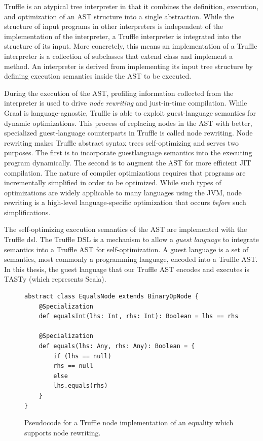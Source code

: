 Truffle is an atypical tree interpreter in that it combines the definition, execution, and optimization of an AST structure into a single abstraction.
While the structure of input programs in other interpreters is independent of the implementation of the interpreter, a Truffle interpreter is integrated into the structure of its input.
More concretely, this means an implementation of a Truffle interpreter is a collection of subclasses that extend  class and implement a  method.
An interpreter is derived from implementing its input tree structure by defining execution semantics inside the AST to be executed.

During the execution of the AST, profiling information collected from the interpreter is used to drive \textit{node rewriting} and just-in-time compilation.
While Graal is language-agnostic, Truffle is able to exploit guest-language semantics for dynamic optimizations.
This process of replacing nodes in the AST with better, specialized guest-language counterparts in Truffle is called node rewriting.
Node rewriting makes Truffle abstract syntax trees self-optimizing and serves two purposes.
The first is to incorporate guestlanguage semantics into the executing program dynamically.
The second is to augment the AST for more efficient JIT compilation.
The nature of compiler optimizations requires that programs are incrementally simplified in order to be optimized.
While such types of optimizations are widely applicable to many languages using the JVM, node rewriting is a high-level language-specific optimization that occurs \textit{before} such simplifications.

The self-optimizing execution semantics of the AST are implemented with the Truffle \acrfull{dsl}.
The Truffle DSL is a mechanism to allow a \textit{guest language} to integrate semantics into a Truffle AST for self-optimization.
A guest language is a set of semantics, most commonly a programming language, encoded into a Truffle AST.
In this thesis, the guest language that our Truffle AST encodes and executes is TASTy (which represents Scala).

\begin{figure}[!htb]
\begin{verbatim}
abstract class EqualsNode extends BinaryOpNode {
	@Specialization
	def equalsInt(lhs: Int, rhs: Int): Boolean = lhs == rhs
	
	@Specialization
	def equals(lhs: Any, rhs: Any): Boolean = {
		if (lhs == null) 
		rhs == null 
		else 
		lhs.equals(rhs)
	}
}
\end{verbatim}
\caption{Pseudocode for a Truffle node implementation of an equality which supports node rewriting.}
\label{example:node-rewriting}
\end{figure}

